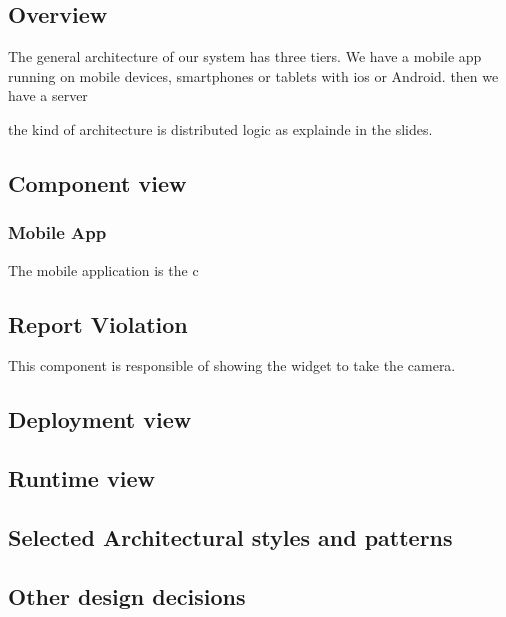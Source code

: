 \subsection{Overview}

The general architecture of our system has three tiers.
We have a mobile app running on mobile devices, smartphones or tablets with ios or Android.
then we have a server

the kind of architecture is distributed logic as explainde in the slides.


\subsection{Component view}

\subsubsection{Mobile App}
The mobile application is the c

\subsection{Report Violation}
This component is responsible of showing the widget to take the camera.
\subsection{}

\subsection{Deployment view}


\subsection{Runtime view}



\subsection{Selected Architectural styles and patterns}

\subsection{Other design decisions}
